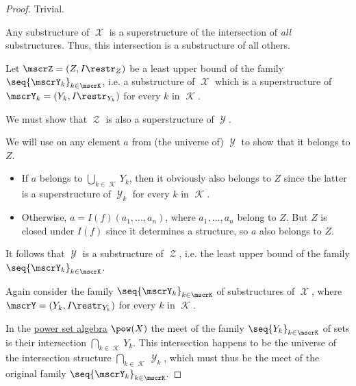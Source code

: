 \begin{proof}
   Trivial.

   Any substructure of \( \mscrX \) is a superstructure of the intersection of \emph{all} substructures. Thus, this intersection is a substructure of all others.

   Let \( \mscrZ = (Z, I\restr_Z) \) be a least upper bound of the family \( \seq{ \mscrY_k }_{k \in \mscrK} \), i.e. a substructure of \( \mscrX \) which is a superstructure of \( \mscrY_k = (Y_k, I\restr_{Y_k}) \) for every \( k \) in \( \mscrK \).

  We must show that \( \mscrZ \) is also a superstructure of \( \mscrY \).

  We will use  on any element \( a \) from (the universe of) \( \mscrY \) to show that it belongs to \( Z \).
  \begin{itemize}
    \item If \( a \) belongs to \( \bigcup_{k \in \mscrK} Y_k \), then it obviously also belongs to \( Z \) since the latter is a superstructure of \( \mscrY_k \) for every \( k \) in \( \mscrK \).

    \item Otherwise, \( a = I(f)(a_1, \ldots, a_n) \), where \( a_1, \ldots, a_n \) belong to \( Z \). But \( Z \) is closed under \( I(f) \) since it determines a structure, so \( a \) also belongs to \( Z \).
  \end{itemize}

  It follows that \( \mscrY \) is a substructure of \( \mscrZ \), i.e. the least upper bound of the family \( \seq{ \mscrY_k }_{k \in \mscrK} \).

   Again consider the family \( \seq{ \mscrY_k }_{k \in \mscrK} \) of substructures of \( \mscrX \), where \( \mscrY = (Y_k, I\restr_{Y_k}) \) for every \( k \) in \( \mscrK \).

  In the \hyperref[def:power_set_algebra]{power set algebra} \( \pow(X) \) the meet of the family \( \seq{ Y_k }_{k \in \mscrK} \) of sets is their intersection \( \bigcap_{k \in \mscrK} Y_k \). This intersection happens to be the universe of the intersection structure \( \bigcap_{k \in \mscrK} \mscrY_k \), which must thus be the meet of the original family \( \seq{ \mscrY_k }_{k \in \mscrK} \).
\end{proof}

